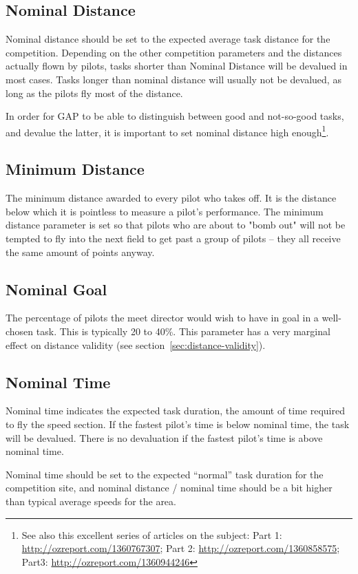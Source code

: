 \documentclass{article}
\begin{document}
\subsection{Nominal Distance}
Nominal distance should be set to the expected average task distance for the
competition. Depending on the other competition parameters and the distances
actually flown by pilots, tasks shorter than Nominal Distance will be devalued
in most cases. Tasks longer than nominal distance will usually not be devalued,
as long as the pilots fly most of the distance.

In order for GAP to be able to distinguish between good and not-so-good tasks,
and devalue the latter, it is important to set nominal distance high
enough\footnote{See also this excellent series of articles on the subject: Part
1: \url{http://ozreport.com/1360767307}; Part 2:
\url{http://ozreport.com/1360858575}; Part3:
\url{http://ozreport.com/1360944246}}.  

\subsection{Minimum Distance}
The minimum distance awarded to every pilot who takes off. It is the distance
below which it is pointless to measure a pilot's performance. The minimum
distance parameter is set so that pilots who are about to "bomb out" will not
be tempted to fly into the next field to get past a group of pilots – they all
receive the same amount of points anyway.

\subsection{Nominal Goal}
The percentage of pilots the meet director would wish to have in goal in
a well-chosen task. This is typically 20 to 40\%. This parameter has a very
marginal effect on distance validity (see section~\ref{sec:distance-validity}).

\subsection{Nominal Time}
Nominal time indicates the expected task duration, the amount of time required
to fly the speed section. If the fastest pilot’s time is below nominal time,
the task will be devalued. There is no devaluation if the fastest pilot’s time
is above nominal time.

Nominal time should be set to the expected “normal” task duration for the
competition site, and nominal distance / nominal time should be a bit higher
than typical average speeds for the area.
\end{document}
